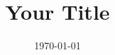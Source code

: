\newcommand{\lang}{english}

\author{\@aut}
\title{Your Title}
\date{\today{}}

\newcommand{\supervisor}{Your Supervisor}
\newcommand{\personalid}{1210640000}
\newcommand{\city}{Eisenstadt}

\newcommand{\subtitle}{bachelor thesis 1/2\\
to obtain the academic degree\\
Bachelor of Science}


 